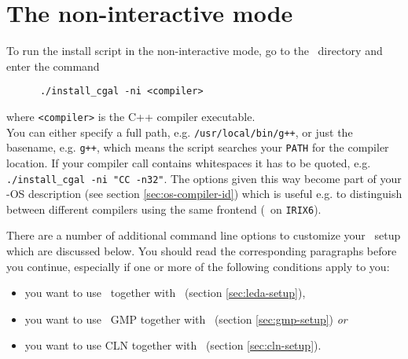 
\section{The non-interactive mode}\label{sec:non-interactive}

To run the install script in the non-interactive mode, go to the
\cgaldir\ directory and enter the command
\begin{verbatim}
      ./install_cgal -ni <compiler>
\end{verbatim}
where \texttt{<compiler>} is the C++ compiler executable.\\
You can either specify a full path, e.g. \texttt{/usr/local/bin/g++},
or just the basename, e.g. \texttt{g++}, which means the script
searches your \texttt{PATH} for the compiler location. If your
compiler call contains whitespaces it has to be quoted, e.g.
\texttt{./install\_cgal -ni "CC -n32"}.  The options given this way
become part of your \cgal-OS description (see section
\ref{sec:os-compiler-id}) which is useful e.g. to distinguish between
different compilers using the same frontend (\mipsprocc\ on
\texttt{IRIX6}).

There are a number of additional command line options to customize
your \cgal\ setup which are discussed below. You should read the
corresponding paragraphs before you continue, especially if one or
more of the following conditions apply to you:
\begin{itemize}
\item you want to use \leda\ together with \cgal\ (section
  \ref{sec:leda-setup}),
\item you want to use \gnu\ GMP together with \cgal\ (section
  \ref{sec:gmp-setup}) \textit{or}
\item you want to use CLN together with \cgal\ (section
  \ref{sec:cln-setup}).
\end{itemize}

